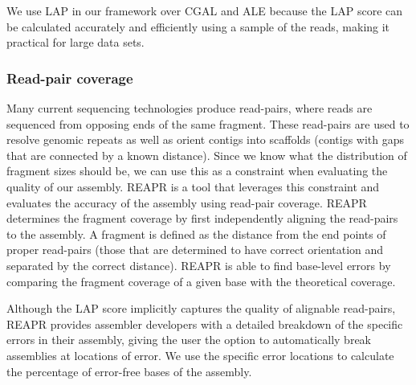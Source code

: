 We use LAP in our framework over CGAL and ALE because the LAP score can be calculated accurately and efficiently using a sample of the reads, making it practical for large data sets.


\subsubsection{Read-pair coverage}


Many current sequencing technologies produce read-pairs, where reads are sequenced from opposing ends of the same fragment.
These read-pairs are used to resolve genomic repeats as well as orient contigs into scaffolds (contigs with gaps that are connected by a known distance).
Since we know what the distribution of fragment sizes should be, we can use this as a constraint when evaluating the quality of our assembly.
REAPR\cite{hunt2013reapr} is a tool that leverages this constraint and evaluates the accuracy of the assembly using read-pair coverage.
REAPR determines the fragment coverage by first independently aligning the read-pairs to the assembly.
A fragment is defined as the distance from the end points of proper read-pairs (those that are determined to have correct orientation and separated by the correct distance).
REAPR is able to find base-level errors by comparing the fragment coverage of a given base with the theoretical coverage.

Although the LAP score implicitly captures the quality of alignable read-pairs, REAPR provides assembler developers with a detailed breakdown of the specific errors in their assembly, giving the user the option to automatically break assemblies at locations of error.
We use the specific error locations to calculate the percentage of error-free bases of the assembly.




